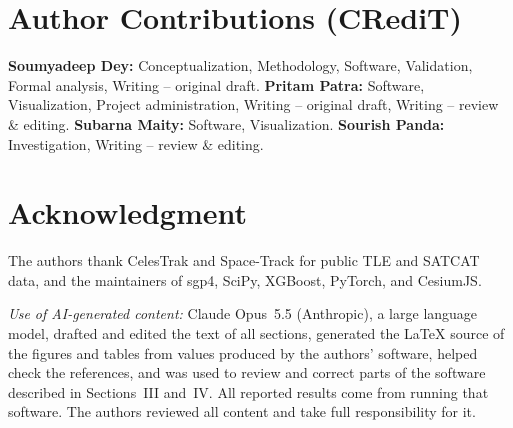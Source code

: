 \documentclass[conference]{IEEEtran}
\begin{document}
\section*{Author Contributions (CRediT)}
\textbf{Soumyadeep Dey:} Conceptualization, Methodology, Software, Validation,
Formal analysis, Writing -- original draft.
\textbf{Pritam Patra:} Software, Visualization, Project administration,
Writing -- original draft, Writing -- review \& editing.
\textbf{Subarna Maity:} Software, Visualization.
\textbf{Sourish Panda:} Investigation, Writing -- review \& editing.

\section*{Acknowledgment}
The authors thank CelesTrak and Space-Track for public TLE and SATCAT data, and
the maintainers of sgp4, SciPy, XGBoost, PyTorch, and CesiumJS.

\textit{Use of AI-generated content:} Claude Opus~5.5 (Anthropic), a large
language model, drafted and edited the text of all sections, generated the
LaTeX source of the figures and tables from values produced by the authors'
software, helped check the references, and was used to review and correct
parts of the software described in Sections~III and~IV. All reported results
come from running that software. The authors reviewed all content and take
full responsibility for it.
\end{document}
